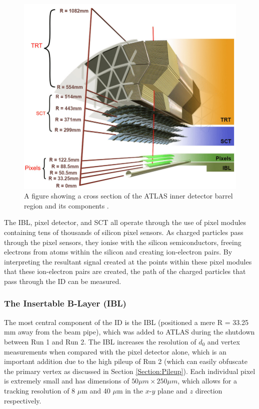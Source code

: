 \documentclass[12pt,a4paper,epsf,portrait,times,epsfig]{report}
\begin{document}
		\begin{figure}
			\centering
			\includegraphics[scale=0.4]{ATLAS_ID_Layers}
			\caption{A figure showing a cross section of the ATLAS inner detector barrel region and its components \cite{ATLASIDImage}.}
			\label{Fig:InnerDetectorXsec}
		\end{figure}

		The IBL, pixel detector, and SCT all operate through the use of pixel modules containing tens of thousands of silicon pixel sensors. As charged particles pass through the pixel sensors, they ionise with the silicon semiconductors, freeing electrons from atoms within the silicon and creating ion-electron pairs. By interpreting the resultant signal created at the points within these pixel modules that these ion-electron pairs are created, the path of the charged particles that pass through the ID can be measured. 

		\subsubsection{The Insertable B-Layer (IBL)}\label{Section:IBL}

		The most central component of the ID is the IBL \cite{IBL-TDR} (positioned a mere R = 33.25 mm away from the beam pipe), which was added to ATLAS during the shutdown between Run 1 and Run 2. The IBL increases the resolution of $d_{0}$ and vertex measurements when compared with the pixel detector alone, which is an important addition due to the high pileup of Run 2 (which can easily obfuscate the primary vertex as discussed in Section \ref{Section:Pileup}). Each individual pixel is extremely small and has dimensions of $50 \mu m \times 250 \mu m$, which allows for a tracking resolution of 8 $\mu$m and 40 $\mu$m in the $x$-$y$ plane and $z$ direction respectively.  
\end{document}
